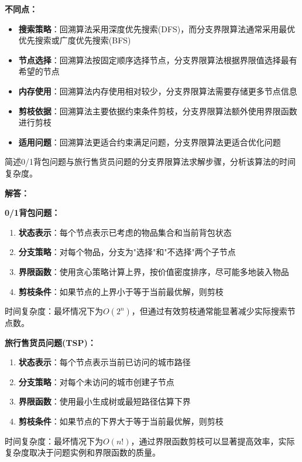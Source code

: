 \documentclass[12pt,twoside]{article}
\begin{document}
\begin{problems}
    {\bf 不同点：}
    \begin{itemize}
        \item {\bf 搜索策略}：回溯算法采用深度优先搜索(DFS)，而分支界限算法通常采用最优优先搜索或广度优先搜索(BFS)
        \item {\bf 节点选择}：回溯算法按固定顺序选择节点，分支界限算法根据界限值选择最有希望的节点
        \item {\bf 内存使用}：回溯算法内存使用相对较少，分支界限算法需要存储更多节点信息
        \item {\bf 剪枝依据}：回溯算法主要依据约束条件剪枝，分支界限算法额外使用界限函数进行剪枝
        \item {\bf 适用问题}：回溯算法更适合约束满足问题，分支界限算法更适合优化问题
    \end{itemize}
    
    \ppart 简述0/1背包问题与旅行售货员问题的分支界限算法求解步骤，分析该算法的时间复杂度。
    
    {\bf 解答：}
    
    {\bf 0/1背包问题：}
    \begin{enumerate}
        \item {\bf 状态表示}：每个节点表示已考虑的物品集合和当前背包状态
        \item {\bf 分支策略}：对每个物品，分支为"选择"和"不选择"两个子节点
        \item {\bf 界限函数}：使用贪心策略计算上界，按价值密度排序，尽可能多地装入物品
        \item {\bf 剪枝条件}：如果节点的上界小于等于当前最优解，则剪枝
    \end{enumerate}
    时间复杂度：最坏情况下为$O(2^n)$，但通过有效剪枝通常能显著减少实际搜索节点数。
    
    {\bf 旅行售货员问题(TSP)：}
    \begin{enumerate}
        \item {\bf 状态表示}：每个节点表示当前已访问的城市路径
        \item {\bf 分支策略}：对每个未访问的城市创建子节点
        \item {\bf 界限函数}：使用最小生成树或最短路径估算下界
        \item {\bf 剪枝条件}：如果节点的下界大于等于当前最优解，则剪枝
    \end{enumerate}
    时间复杂度：最坏情况下为$O(n!)$，通过界限函数剪枝可以显著提高效率，实际复杂度取决于问题实例和界限函数的质量。
\eparts


\end{problems}
\end{document}
